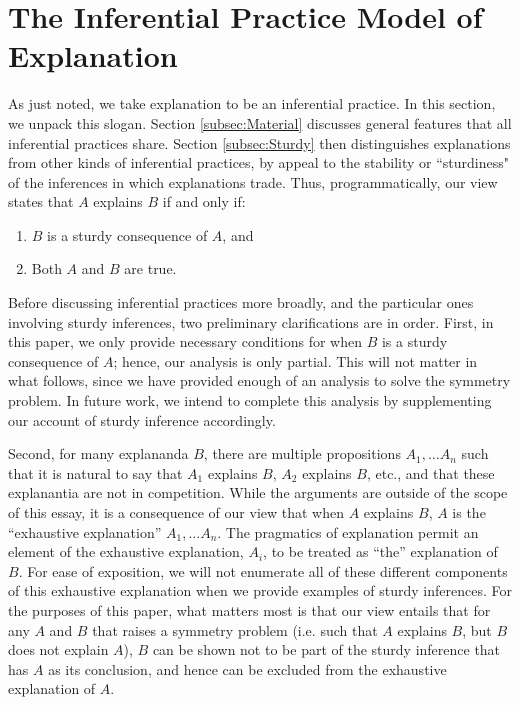 \documentclass[natbib]{svjour3}                     %
\begin{document}
\section{The Inferential Practice Model of Explanation}
\label{sec:kernel}
As just noted, we take explanation to be an inferential practice. In this section, we unpack this slogan. Section \ref{subsec:Material} discusses general features that all inferential practices share. Section \ref{subsec:Sturdy} then distinguishes explanations from other kinds of inferential practices, by appeal to the stability or ``sturdiness" of the inferences in which explanations trade. Thus, programmatically, our view states that $A$ explains $B$ if and only if:

\begin{enumerate}
\item $B$ is a sturdy consequence of $A$, and 
\item Both $A$ and $B$ are true.
\end{enumerate}

Before discussing inferential practices more broadly, and the particular ones involving sturdy inferences, two preliminary clarifications are in order. First,  in this paper, we only provide necessary conditions for when $B$ is a sturdy consequence of $A$; hence, our analysis is only partial. This will not matter in what follows, since we have provided enough of an analysis to solve the symmetry problem. In future work, we intend to complete this analysis by supplementing our account of sturdy inference accordingly. 

Second, for many explananda $B$, there are multiple propositions $A_1, \ldots A_n$­ such that it is natural to say that $A_1$ explains $B$, $A_2$ explains $B$, etc., and that these explanantia are not in competition. While the arguments are outside of the scope of this essay, it is a consequence of our view that when $A$ explains $B$, $A$ is the ``exhaustive explanation'' $A_1, \ldots A_n$.  The pragmatics of explanation permit an element of the exhaustive explanation, $A_i$, to be treated as ``the'' explanation of $B$. For ease of exposition, we will not enumerate all of these different components of this exhaustive explanation when we provide examples of sturdy inferences. For the purposes of this paper, what matters most is that our view entails that for any $A$ and $B$ that raises a symmetry problem (i.e. such that $A$ explains $B$, but $B$ does not explain $A$), $B$ can be shown not to be part of the sturdy inference that has $A$ as its conclusion, and hence can be excluded from the exhaustive explanation of $A$.
\end{document}
